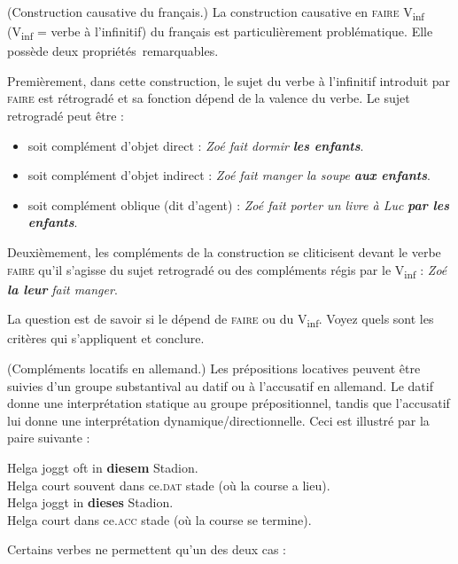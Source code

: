 {     (Construction causative du français.) La construction causative en \textsc{faire} V\textsubscript{inf}
     (V\textsubscript{inf} = verbe à l’infinitif) du français est particulièrement problématique. Elle possède deux propriétés~remarquables.

    Premièrement, dans cette construction, le sujet du verbe à l’infinitif introduit par \textsc{faire} est rétrogradé et sa fonction dépend de la valence du verbe. Le sujet retrogradé peut être :
    \begin{itemize}
    \item  soit complément d’objet direct : \textit{Zoé fait dormir} \textbf{\textit{les enfants}}.
    \item  soit complément d’objet indirect : \textit{Zoé fait manger la soupe} \textbf{\textit{aux enfants}}.
    \item  soit complément oblique (dit d’agent) : \textit{Zoé fait porter un livre à Luc} \textbf{\textit{par les enfants}}.
    \end{itemize}
    Deuxièmement, les compléments de la construction se cliticisent devant le verbe \textsc{faire} qu’il s’agisse du sujet retrogradé ou des compléments régis par le V\textsubscript{inf} : \textit{Zoé} \textbf{\textit{la leur}} \textit{fait manger}.

    La question est de savoir si le  dépend de \textsc{faire} ou du V\textsubscript{inf}. Voyez quels sont les critères qui s’appliquent et conclure.

     (Compléments locatifs en allemand.) Les prépositions locatives peuvent être suivies d’un groupe substantival au datif ou à l’accusatif en allemand. Le datif donne une interprétation statique au groupe prépositionnel, tandis que l’accusatif lui donne une interprétation dynamique/directionnelle. Ceci est illustré par la paire suivante :

    \begin{exe}
    \gll   Helga joggt oft in \textbf{diesem} Stadion.\\
    Helga court souvent dans ce.\textsc{dat} stade (où la course a lieu).\\
    \gll   Helga joggt in \textbf{dieses} Stadion.\\
    Helga court dans ce.\textsc{acc} stade (où la course se termine).\\
    \end{exe}
    
   \noindent Certains verbes ne permettent qu’un des deux cas :

}
